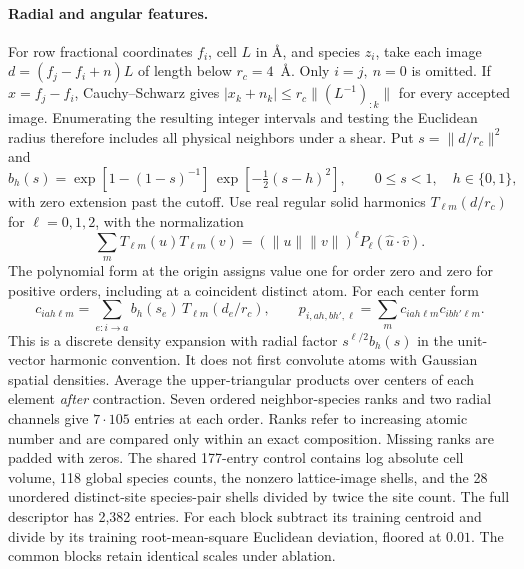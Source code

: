 \paragraph{Radial and angular features.}
For row fractional coordinates $f_i$, cell $L$ in \AA, and species $z_i$, take each image
$d=(f_j-f_i+n)L$ of length below $r_c=4$~\AA. Only $i=j,\ n=0$ is omitted.
If $x=f_j-f_i$, Cauchy--Schwarz gives
$|x_k+n_k|\le r_c\|(L^{-1})_{:k}\|$ for every accepted image.
Enumerating the resulting integer intervals and testing the Euclidean radius therefore
includes all physical neighbors under a shear. Put $s=\|d/r_c\|^2$ and
\[
 b_h(s)=\exp[1-(1-s)^{-1}]\,\exp[-\tfrac12(s-h)^2],
 \qquad 0\leq s<1,\quad h\in\{0,1\},
\]
with zero extension past the cutoff. Use real regular solid harmonics
$T_{\ell m}(d/r_c)$ for $\ell=0,1,2$, with the normalization
\[
 \sum_m T_{\ell m}(u)T_{\ell m}(v)=(\|u\|\|v\|)^\ell
 P_\ell(\widehat u\cdot\widehat v).
\]
The polynomial form at the origin assigns value one for order zero and zero for
positive orders, including at a coincident distinct atom. For each center form
\[
 c_{iah\ell m}=\sum_{e:i\to a} b_h(s_e)\, T_{\ell m}(d_e/r_c),\qquad
 p_{i,ah,bh',\ell}=\sum_m c_{iah\ell m}c_{ibh'\ell m}.
\]
This is a discrete density expansion with radial factor $s^{\ell/2}b_h(s)$ in the unit-vector
harmonic convention. It does not first convolute atoms with Gaussian spatial densities.
Average the upper-triangular products over centers of each element \emph{after} contraction.
Seven ordered neighbor-species ranks and two radial channels give $7\cdot105$ entries at
each order. Ranks refer to increasing atomic number and are compared only within an exact
composition. Missing ranks are padded with zeros. The shared 177-entry control contains
log absolute cell volume, 118 global species counts, the nonzero lattice-image shells,
and the 28 unordered distinct-site species-pair shells divided by twice the site count.
The full descriptor has 2,382 entries. For each block subtract its training centroid and
divide by its training root-mean-square Euclidean deviation, floored at $0.01$.
The common blocks retain identical scales under ablation.

